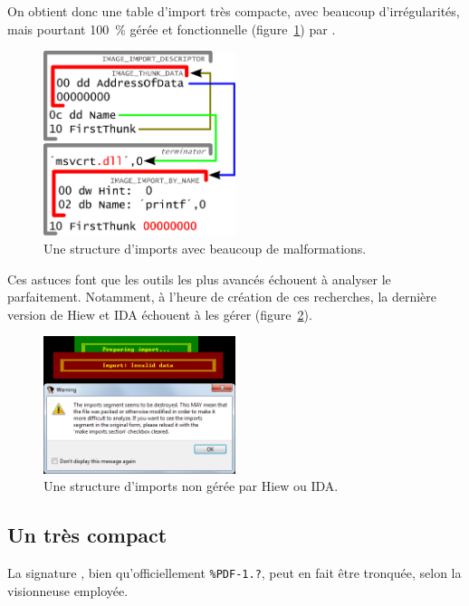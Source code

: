 On obtient donc une table d'import très compacte, avec beaucoup d'irrégularités, mais pourtant 100~\% gérée et fonctionnelle (figure~\ref{fig:albertini:imports}) par \WIN.

\begin{figure}[p]
  \centering
  \includegraphics[width=0.5\textwidth]{albertini/img/imports}
  \caption{Une structure d'imports avec beaucoup de malformations.}
  \label{fig:albertini:imports}
\end{figure}

Ces astuces font que les outils les plus avancés échouent à analyser le \PE parfaitement. Notamment, à l'heure de création de ces recherches, la dernière version de Hiew et IDA échouent à les gérer (figure~\ref{fig:albertini:imports_error}).

\begin{figure}[p]
  \centering
  \includegraphics[width=0.5\textwidth]{albertini/img/imports_error}
  \caption{Une structure d'imports non gérée par Hiew ou IDA.}
  \label{fig:albertini:imports_error}
\end{figure}



\subsection{Un \PDF très compact}
La signature \PDF, bien qu'officiellement \texttt{\%PDF-1.?}, peut en fait être tronquée, selon la visionneuse employée.

